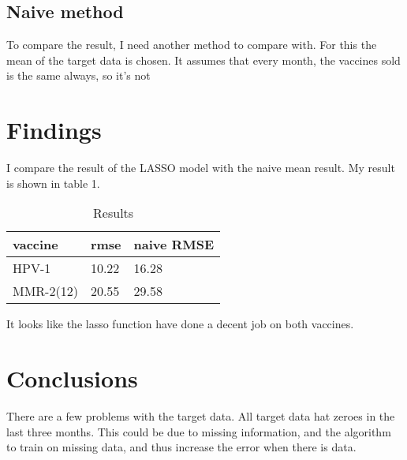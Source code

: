 \documentclass{sig-alternate}
\begin{document}
\subsection{Naive method}To compare the result, I need another method to compare with. For this the mean of the target data is chosen. It assumes that every month, the vaccines sold is the same always, so it's not 
\section{Findings}
I compare the result of the LASSO model with the naive mean result.
My result is shown in table 1.
\begin{table}[!h]
\centering
\caption{Results}
\label{my-label}
\begin{tabular}{|l|l|l|}
\hline
vaccine   & rmse  & naive RMSE \\ \hline
HPV-1     & 10.22 & 16.28 \\ \hline
MMR-2(12) & 20.55 & 29.58 \\ \hline
\end{tabular}
\end{table}
It looks like the lasso function have done a decent job on both vaccines. 


\section{Conclusions}
There are a few problems with the target data. All target data hat zeroes in the last three months. This could be due to missing information, and the algorithm to train on missing data, and thus increase the error when there is data.



%
%
\end{document}
